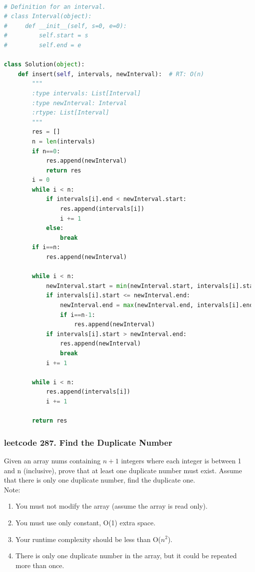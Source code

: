 \documentclass[a4paper,10pt]{article}
\begin{document}
\begin{lstlisting}[language=Python, caption=Problem57. Insert Interval]

# Definition for an interval.
# class Interval(object):
#     def __init__(self, s=0, e=0):
#         self.start = s
#         self.end = e

class Solution(object):
    def insert(self, intervals, newInterval):  # RT: O(n)
        """
        :type intervals: List[Interval]
        :type newInterval: Interval
        :rtype: List[Interval]
        """
        res = []
        n = len(intervals)
        if n==0: 
            res.append(newInterval) 
            return res
        i = 0
        while i < n:
            if intervals[i].end < newInterval.start:
                res.append(intervals[i])
                i += 1
            else:
                break
        if i==n:
            res.append(newInterval)
        
        while i < n:
            newInterval.start = min(newInterval.start, intervals[i].start)
            if intervals[i].start <= newInterval.end:
                newInterval.end = max(newInterval.end, intervals[i].end)
                if i==n-1:
                    res.append(newInterval)
            if intervals[i].start > newInterval.end:
                res.append(newInterval)
                break
            i += 1
        
        while i < n: 
            res.append(intervals[i])
            i += 1
            
        return res
\end{lstlisting}



\subsubsection{leetcode 287. Find the Duplicate Number}
Given an array nums containing $n+1$ integers where each integer is between 1 and n (inclusive), prove that at least one duplicate number must exist. Assume that there is only one duplicate number, find the duplicate one. \\

\noindent Note:
\begin{enumerate}
    \item You must not modify the array (assume the array is read only).
    \item You must use only constant, O(1) extra space.
    \item Your runtime complexity should be less than O($n^2$).
    \item There is only one duplicate number in the array, but it could be repeated more than once.
\end{enumerate}
\end{document}
